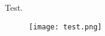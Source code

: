 \documentclass{article}
\begin{document}
Test.
\begin{figure}
\texttt{[image: test.png]}
\end{figure}
\end{document}
